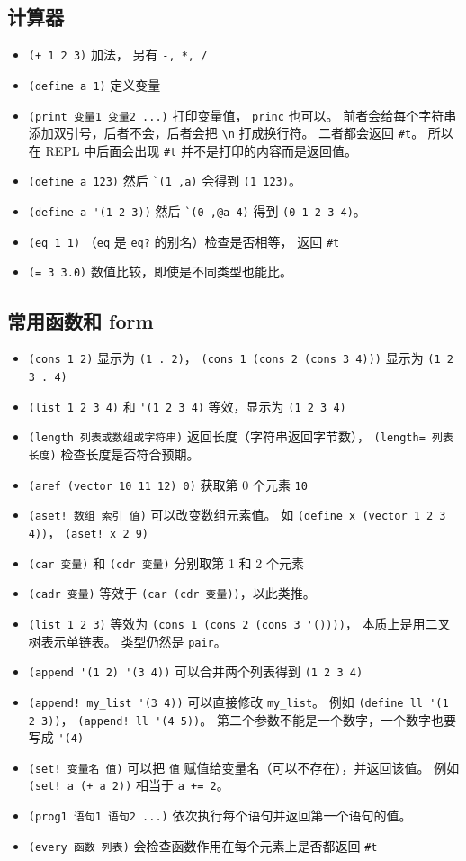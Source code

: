 \subsection{计算器}
\begin{itemize}
\item \verb`(+ 1 2 3)` 加法， 另有 \verb`-, *, /`
\item \verb`(define a 1)` 定义变量
\item \verb`(print 变量1 变量2 ...)` 打印变量值， \verb`princ` 也可以。 前者会给每个字符串添加双引号，后者不会，后者会把 \verb`\n` 打成换行符。 二者都会返回 \verb`#t`。 所以在 REPL 中后面会出现 \verb`#t` 并不是打印的内容而是返回值。
\item \verb`(define a 123)` 然后 \verb|`(1 ,a)| 会得到 \verb`(1 123)`。
\item \verb`(define a '(1 2 3))` 然后 \verb|`(0 ,@a 4)| 得到 \verb`(0 1 2 3 4)`。
\item \verb`(eq 1 1)` （\verb`eq` 是 \verb`eq?` 的别名）检查是否相等， 返回 \verb`#t`
\item \verb`(= 3 3.0)` 数值比较，即使是不同类型也能比。
\end{itemize}

\subsection{常用函数和 form}
\begin{itemize}
\item \verb`(cons 1 2)` 显示为 \verb`(1 . 2)`， \verb`(cons 1 (cons 2 (cons 3 4)))` 显示为 \verb`(1 2 3 . 4)`
\item \verb`(list 1 2 3 4)` 和 \verb`'(1 2 3 4)` 等效，显示为 \verb`(1 2 3 4)`
\item \verb`(length 列表或数组或字符串)` 返回长度（字符串返回字节数）， \verb`(length= 列表 长度)` 检查长度是否符合预期。
\item \verb`(aref (vector 10 11 12) 0)` 获取第 0 个元素 \verb`10`
\item \verb`(aset! 数组 索引 值)` 可以改变数组元素值。 如 \verb`(define x (vector 1 2 3 4))`， \verb`(aset! x 2 9)`
\item \verb`(car 变量)` 和 \verb`(cdr 变量)` 分别取第 1 和 2 个元素
\item \verb`(cadr 变量)` 等效于 \verb`(car (cdr 变量))`，以此类推。
\item \verb`(list 1 2 3)` 等效为 \verb`(cons 1 (cons 2 (cons 3 '())))`， 本质上是用二叉树表示单链表。 类型仍然是 \verb`pair`。
\item \verb`(append '(1 2) '(3 4))` 可以合并两个列表得到 \verb`(1 2 3 4)`
\item \verb`(append! my_list '(3 4))` 可以直接修改 \verb`my_list`。 例如 \verb`(define ll '(1 2 3))`， \verb`(append! ll '(4 5))`。 第二个参数不能是一个数字，一个数字也要写成 \verb`'(4)`
\item \verb`(set! 变量名 值)` 可以把 \verb`值` 赋值给变量名（可以不存在），并返回该值。 例如 \verb`(set! a (+ a 2))` 相当于 \verb`a += 2`。
\item \verb`(prog1 语句1 语句2 ...)` 依次执行每个语句并返回第一个语句的值。
\item \verb`(every 函数 列表)` 会检查函数作用在每个元素上是否都返回 \verb`#t`
\end{itemize}

